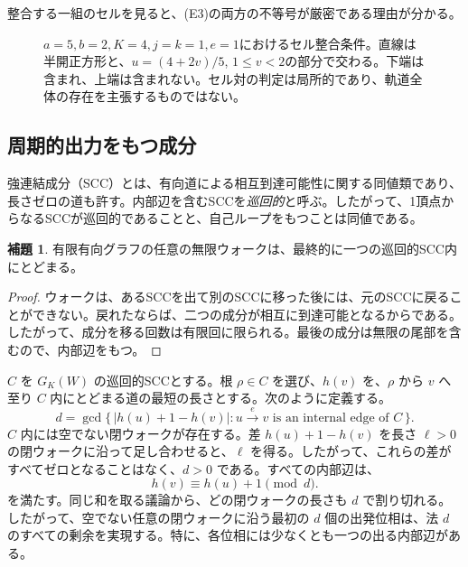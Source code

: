 \documentclass[11pt,reqno]{amsart}
\theoremstyle{definition}
\newtheorem{lemma}[theorem]{補題}
\theoremstyle{definition}
\theoremstyle{remark}
\begin{document}
整合する一組のセルを見ると、(E3)の両方の不等号が厳密である理由が分かる。

\begin{figure}[htbp]
\centering

\caption{\(a=5,b=2,K=4,j=k=1,e=1\)におけるセル整合条件。直線は半開正方形と、\(u=(4+2v)/5\), \(1\le v<2\)の部分で交わる。下端は含まれ、上端は含まれない。セル対の判定は局所的であり、軌道全体の存在を主張するものではない。}
\label{fig:cell-intersection}
\end{figure}

\subsection{周期的出力をもつ成分}\label{sec:3.2}

強連結成分（SCC）とは、有向道による相互到達可能性に関する同値類であり、長さゼロの道も許す。内部辺を含むSCCを\emph{巡回的}と呼ぶ。したがって、1頂点からなるSCCが巡回的であることと、自己ループをもつことは同値である。

\begin{samepage}
\begin{lemma}\leavevmode\label{thm:6}
有限有向グラフの任意の無限ウォークは、最終的に一つの巡回的SCC内にとどまる。
\label{thm-end:6}
\end{lemma}
\end{samepage}

\begin{proof}\leavevmode\label{proof:6}
ウォークは、あるSCCを出て別のSCCに移った後には、元のSCCに戻ることができない。戻れたならば、二つの成分が相互に到達可能となるからである。したがって、成分を移る回数は有限回に限られる。最後の成分は無限の尾部を含むので、内部辺をもつ。\qedhere
\end{proof}

\(C\) を \(G_K(W)\) の巡回的SCCとする。根 \(\rho\in C\) を選び、\(h(v)\) を、\(\rho\) から \(v\) へ至り \(C\) 内にとどまる道の最短の長さとする。次のように定義する。
\[
d=\gcd\{\,|h(u)+1-h(v)|:
u\xrightarrow{e}v\text{ is an internal edge of }C\,\}.
\tag{14}\label{eq:14}
\]
\(C\) 内には空でない閉ウォークが存在する。差 \(h(u)+1-h(v)\) を長さ \(\ell>0\) の閉ウォークに沿って足し合わせると、\(\ell\) を得る。したがって、これらの差がすべてゼロとなることはなく、\(d>0\) である。すべての内部辺は、
\[
h(v)\equiv h(u)+1\pmod d.
\tag{15}\label{eq:15}
\]
を満たす。同じ和を取る議論から、どの閉ウォークの長さも \(d\) で割り切れる。したがって、空でない任意の閉ウォークに沿う最初の \(d\) 個の出発位相は、法 \(d\) のすべての剰余を実現する。特に、各位相には少なくとも一つの出る内部辺がある。
\end{document}
